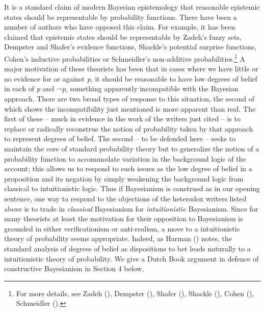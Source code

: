 \documentclass[
  11pt,
  letterpaper,
  DIV=11,
  numbers=noendperiod,
  twoside]{scrartcl}
\begin{document}
It is a standard claim of modern Bayesian epistemology that reasonable
epistemic states should be representable by probability functions. There
have been a number of authors who have opposed this claim. For example,
it has been claimed that epistemic states should be representable by
Zadeh's fuzzy sets, Dempster and Shafer's evidence functions, Shackle's
potential surprise functions, Cohen's inductive probabilities or
Schmeidler's non-additive probabilities.\footnote{For more details, see
  Zadeh (), Dempster
  (), Shafer
  (), Shackle
  (), Cohen
  (), Schmeidler
  ().} A major motivation of these
theorists has been that in cases where we have little or no evidence for
or against \emph{p}, it should be reasonable to have low degrees of
belief in each of \emph{p} and ¬\emph{p}, something apparently
incompatible with the Bayesian approach. There are two broad types of
response to this situation, the second of which shows the
incompatibility just mentioned is more apparent than real. The first of
these -- much in evidence in the work of the writers just cited -- is to
replace or radically reconstrue the notion of probability taken by that
approach to represent degrees of belief. The second -- to be defended
here -- seeks to maintain the core of standard probability theory but to
generalize the notion of a probability function to accommodate variation
in the background logic of the account; this allows us to respond to
such issues as the low degree of belief in a proposition and its
negation by simply weakening the background logic from classical to
intuitionistic logic. Thus if Bayesianism is construed as in our opening
sentence, one way to respond to the objections of the heterodox writers
listed above is to trade in \emph{classical} Bayesianism for
\emph{intuitionistic} Bayesianism. Since for many theorists at least the
motivation for their opposition to Bayesianism is grounded in either
verificationism or anti-realism, a move to a intuitionistic theory of
probability seems appropriate. Indeed, as Harman
() notes, the standard analysis of
degrees of belief as dispositions to bet leads naturally to a
intuitionistic theory of probability. We give a Dutch Book argument in
defence of constructive Bayesianism in Section 4 below.
\end{document}
